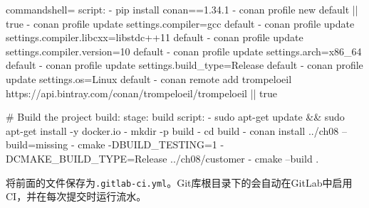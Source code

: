 \begin{tcblisting}{commandshell={}}
  script:
  - pip install conan==1.34.1
  - conan profile new default || true
  - conan profile update settings.compiler=gcc default
  - conan profile update settings.compiler.libcxx=libstdc++11 default
  - conan profile update settings.compiler.version=10 default
  - conan profile update settings.arch=x86_64 default
  - conan profile update settings.build_type=Release default
  - conan profile update settings.os=Linux default
  - conan remote add trompeloeil
https://api.bintray.com/conan/trompeloeil/trompeloeil || true

# Build the project
build:
  stage: build
  script:
  - sudo apt-get update && sudo apt-get install -y docker.io
  - mkdir -p build
  - cd build
  - conan install ../ch08 --build=missing
  - cmake -DBUILD_TESTING=1 -DCMAKE_BUILD_TYPE=Release ../ch08/customer
  - cmake --build .
\end{tcblisting}

将前面的文件保存为\texttt{.gitlab-ci.yml}。Git库根目录下的会自动在GitLab中启用CI，并在每次提交时运行流水。



